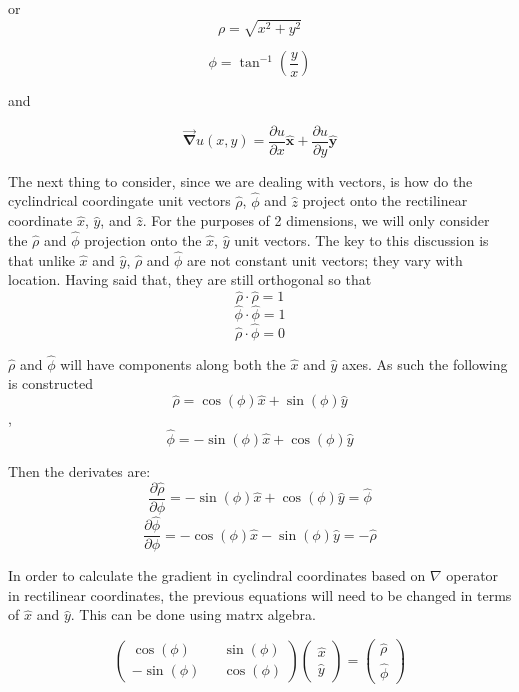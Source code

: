 \documentclass[11pt]{article}
\begin{document}
or \begin{equation}
\rho = \sqrt{x^2 + y^2}
\label{eq:eq3c} \tag{3c}
\end{equation}

\begin{equation}
\phi = \tan^{-1} \left( \frac{y}{x} \right)
\label{eq:eq3d} \tag{3d}
\end{equation}

and

\begin{equation}
\vec{\mathbf{\nabla}} u(x,y) = \frac{\partial u}{\partial x} \hat{\mathbf{x}} + \frac{\partial u}{\partial y} \hat{\mathbf{y}}
\label{eq:eq4} \tag{4}
\end{equation}

The next thing to consider, since we are dealing with vectors, is how do
the cyclindrical coordingate unit vectors \(\hat{\rho}\), \(\hat{\phi}\)
and \(\hat{z}\) project onto the rectilinear coordinate \(\hat{x}\),
\(\hat{y}\), and \(\hat{z}\). For the purposes of 2 dimensions, we will
only consider the \(\hat{\rho}\) and \(\hat{\phi}\) projection onto the
\(\hat{x}\), \(\hat{y}\) unit vectors. The key to this discussion is
that unlike \(\hat{x}\) and \(\hat{y}\), \(\hat{\rho}\) and
\(\hat{\phi}\) are not constant unit vectors; they vary with location.
Having said that, they are still orthogonal so that
\[\hat{\rho} \cdot \hat{\rho} = 1\] \[\hat{\phi} \cdot \hat{\phi} = 1\]
\[\hat{\rho} \cdot \hat{\phi} = 0\]

\(\hat{\rho}\) and \(\hat{\phi}\) will have components along both the
\(\hat{x}\) and \(\hat{y}\) axes. As such the following is constructed
\[\hat{\rho} = \cos(\phi) \hat{x} + \sin(\phi) \hat{y}\],
\[\hat{\phi} = -\sin(\phi) \hat{x} + \cos(\phi) \hat{y}\]

Then the derivates are:
\[\frac{\partial \hat{\rho}}{\partial \phi} = -\sin(\phi) \hat{x} + \cos(\phi) \hat{y} = \hat{\phi}\]
\[\frac{\partial \hat{\phi}}{\partial \phi} = -\cos(\phi) \hat{x} - \sin(\phi) \hat{y} = -\hat{\rho}\]

In order to calculate the gradient in cyclindral coordinates based on
\(\nabla\) operator in rectilinear coordinates, the previous equations
will need to be changed in terms of \(\hat{x}\) and \(\hat{y}\). This
can be done using matrx algebra.

\[\left(\begin{array}{cc} \cos(\phi) && \sin(\phi) \\ -\sin(\phi) && \cos(\phi) \end{array} \right) 
\left( \begin{array}{c} \hat{x} \\ \hat{y} \end{array} \right) = \left( \begin{array}{c} \hat{\rho} \\ \hat{\phi} \end{array} \right)\]
\end{document}
